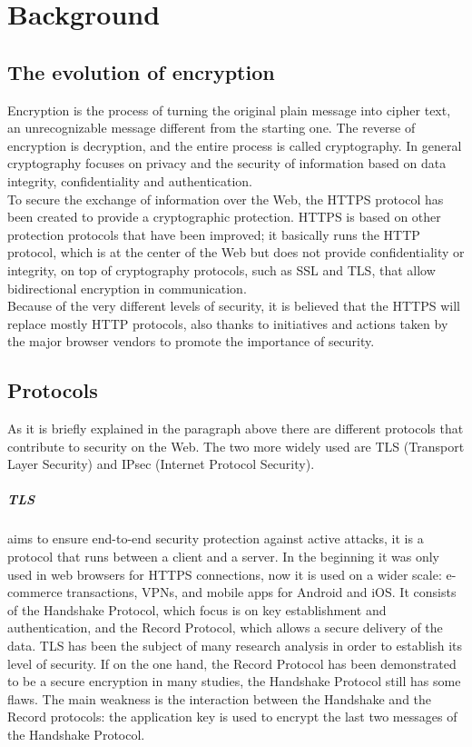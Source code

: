 \section{Background}
\subsection{The evolution of encryption}
Encryption is the process of turning the original plain 
message into cipher text, an unrecognizable message 
different from the starting one.
The reverse of encryption is decryption, and the entire 
process is called cryptography. In general cryptography
focuses on privacy and the security of information based 
on data integrity, confidentiality and authentication. \cite{journal33}
\\To secure the exchange of information over the Web, the HTTPS
protocol has been created to provide a cryptographic protection. 
HTTPS is based on other protection protocols that have been improved;
it basically runs the HTTP protocol, which is at the center of the Web but does 
not provide confidentiality or integrity, on top of cryptography protocols, such as SSL and TLS,
that allow bidirectional encryption in communication. 
\\ Because of the very different levels of security, it is believed 
that the HTTPS will replace mostly HTTP protocols, also thanks to
initiatives and actions taken by the major browser vendors to 
promote the importance of security. \cite{postcards}

\subsection{Protocols}
As it is briefly explained in the paragraph above there are different protocols 
that contribute to security on the Web. The two more widely used are TLS (Transport Layer Security) and IPsec (Internet Protocol Security).
\subparagraph{TLS} aims to ensure end-to-end security protection against active attacks, 
it is a protocol that runs between a client and a server. In the
beginning it was only used in web browsers for HTTPS connections, now it is used on
a wider scale: e-commerce transactions, VPNs, and mobile apps for Android and iOS. 
It consists of the Handshake Protocol, which focus is on key establishment and authentication, 
and the Record Protocol, which allows a secure delivery of the data. TLS has been the 
subject of many research analysis in order to establish its level of security. If on
the one hand, the Record Protocol has been demonstrated to be a secure encryption in many studies,
the Handshake Protocol still has some flaws. The main weakness is the interaction between 
the Handshake and the Record protocols: the application key is used to encrypt the last two messages
of the Handshake Protocol. \cite{tls}

